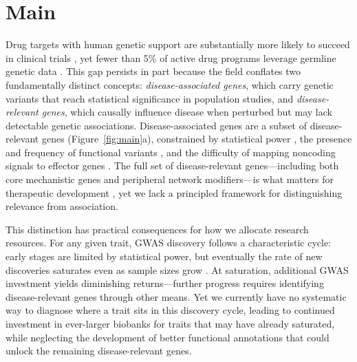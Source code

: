 \section{Main}\label{sec:introduction}


Drug targets with human genetic support are substantially more likely to succeed in clinical trials \cite{plenge_validating_2013,minikel_refining_2024}, yet fewer than 5\% of active drug programs leverage germline genetic data \cite{minikel_refining_2024}. This gap persists in part because the field conflates two fundamentally distinct concepts: \textit{disease-associated genes}, which carry genetic variants that reach statistical significance in population studies, and \textit{disease-relevant genes}, which causally influence disease when perturbed but may lack detectable genetic associations. Disease-associated genes are a subset of disease-relevant genes (Figure~\ref{fig:main}a), constrained by statistical power \cite{wang_statistical_2019}, the presence and frequency of functional variants \cite{gazal_linkage_2017}, and the difficulty of mapping noncoding signals to effector genes \cite{schipper_demystifying_2022,costanzo_realizing_2025}. The full set of disease-relevant genes---including both core mechanistic genes and peripheral network modifiers---is what matters for therapeutic development \cite{finan_druggable_2017,jhamb_pathway_2019}, yet we lack a principled framework for distinguishing relevance from association.

This distinction has practical consequences for how we allocate research resources. For any given trait, GWAS discovery follows a characteristic cycle: early stages are limited by statistical power, but eventually the rate of new discoveries saturates even as sample sizes grow \cite{abdellaoui_15_2023}. At saturation, additional GWAS investment yields diminishing returns---further progress requires identifying disease-relevant genes through other means. Yet we currently have no systematic way to diagnose where a trait sits in this discovery cycle, leading to continued investment in ever-larger biobanks for traits that may have already saturated, while neglecting the development of better functional annotations that could unlock the remaining disease-relevant genes.

